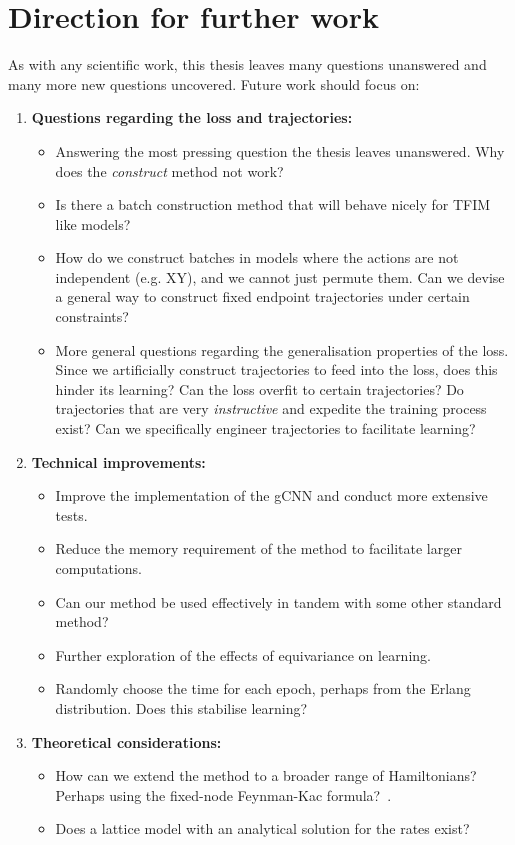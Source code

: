 \section{Direction for further work}
As with any scientific work, this thesis leaves many questions unanswered and many more new questions uncovered. Future work should focus on:

\begin{enumerate}
	\item \textbf{Questions regarding the loss and trajectories:} 
	\begin{itemize}
		\item Answering the most pressing question the thesis leaves unanswered. Why does the \emph{construct} method not work?
		
		\item Is there a batch construction method that will behave nicely for TFIM like models?
		
		\item How do we construct batches in models where the actions are not independent (e.g. XY), and we cannot just permute them. Can we devise a general way to construct fixed endpoint trajectories under certain constraints?

		\item More general questions regarding the generalisation properties of the loss. Since we artificially construct trajectories to feed into the loss, does this hinder its learning? Can the loss overfit to certain trajectories? Do trajectories that are very \emph{instructive} and expedite the training process exist? Can we specifically engineer trajectories to facilitate learning?
	
	\end{itemize}
	
	\item \textbf{Technical improvements:}
	\begin{itemize}
		\item Improve the implementation of the gCNN and conduct more extensive tests.
		\item Reduce the memory requirement of the method to facilitate larger computations. 
		\item Can our method be used effectively in tandem with some other standard method?
		\item Further exploration of the effects of equivariance on learning.
		\item Randomly choose the time for each epoch, perhaps from the Erlang distribution. Does this stabilise learning?
	\end{itemize}
	
	\item \textbf{Theoretical considerations:}
	\begin{itemize}
		\item How can we extend the method to a broader range of Hamiltonians? Perhaps using the fixed-node Feynman-Kac formula?~\cite{caffarel2015talking}.
		\item Does a lattice model with an analytical solution for the rates exist?
	\end{itemize}

\end{enumerate}







